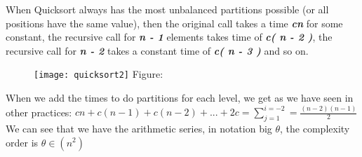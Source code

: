 \begin{enumerate}
When Quicksort always has the most unbalanced partitions possible (or all positions have the same value), then the original call takes a time {\bfseries\itshape cn} for some constant, the recursive call for {\bfseries\itshape n - 1} elements takes time of {\bfseries\itshape c( n - 2 )}, the recursive call for {\bfseries\itshape n - 2} takes a constant time of {\bfseries\itshape c( n - 3 )} and so on.

\begin{figure}[H]
\texttt{[image: quicksort2]}
\centering \linebreak \linebreak Figure: 
\end{figure}

When we add the times to do partitions for each level, we get as we have seen in other practices:\newline
\newline
$cn + c(n -1) + c(n -2) + ... + 2c = \sum_{j=1}^{i=-2} = \frac{(n-2)(n-1)}{2}$ \newline\newline
We can see that we have the arithmetic series, in notation big $\theta$, the complexity order is $\theta \in (n^{2})$\newline
\end{enumerate}

\pagebreak